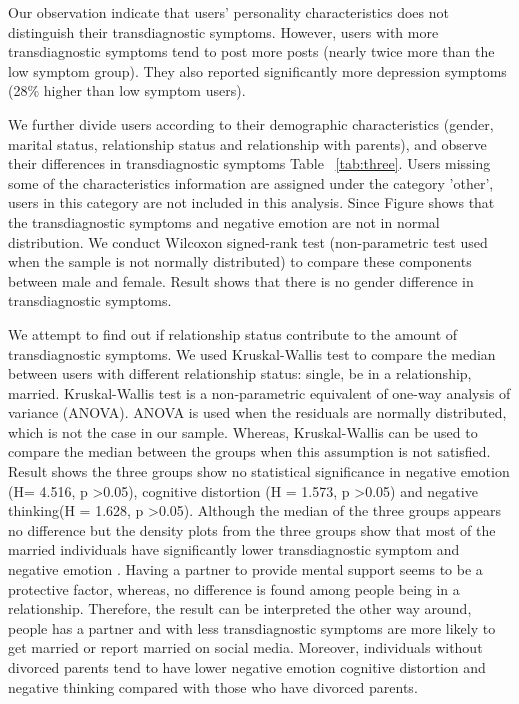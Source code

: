 Our observation indicate that users' personality characteristics does not distinguish their transdiagnostic symptoms. However, users with more transdiagnostic symptoms tend to post more posts (nearly twice more than the low symptom group).  They also reported significantly more depression symptoms (28\% higher than low symptom users).

We further divide users according to their demographic characteristics (gender, marital status, relationship status and relationship with parents), and observe their differences in transdiagnostic symptoms Table ~\ref{tab:three}. Users missing some of the characteristics information are assigned under the category 'other', users in this category are not included in this analysis. Since Figure \label{fig:two} shows that the transdiagnostic symptoms and negative emotion are not in normal distribution. We conduct Wilcoxon signed-rank test (non-parametric test used when the sample is not normally distributed) to compare these components between male and female. Result shows that there is no gender difference in transdiagnostic symptoms. 

We attempt to find out if relationship status contribute to the amount of transdiagnostic symptoms. We used Kruskal-Wallis test to compare the median between users with different relationship status: single, be in a relationship, married. Kruskal-Wallis test is a non-parametric equivalent of one-way analysis of variance (ANOVA). ANOVA is used when the residuals are normally distributed, which is not the case in our sample. Whereas, Kruskal-Wallis can be used to compare the median between the groups when this assumption is not satisfied. Result shows the three groups show no statistical significance in negative emotion (H= 4.516, p >0.05), cognitive distortion (H = 1.573, p >0.05) and negative thinking(H = 1.628, p >0.05). Although the median of the three groups appears no difference but the density plots from the three groups show that most of the married individuals have significantly lower transdiagnostic symptom and negative emotion \label{fig:three}. Having a partner to provide mental support seems to be a protective factor, whereas, no difference is found among people being in a relationship. Therefore, the result can be interpreted the other way around, people has a partner and with less transdiagnostic symptoms are more likely to get married or report married on social media. Moreover, individuals without divorced parents tend to have lower negative emotion cognitive distortion and negative thinking compared with those who have divorced parents. 

